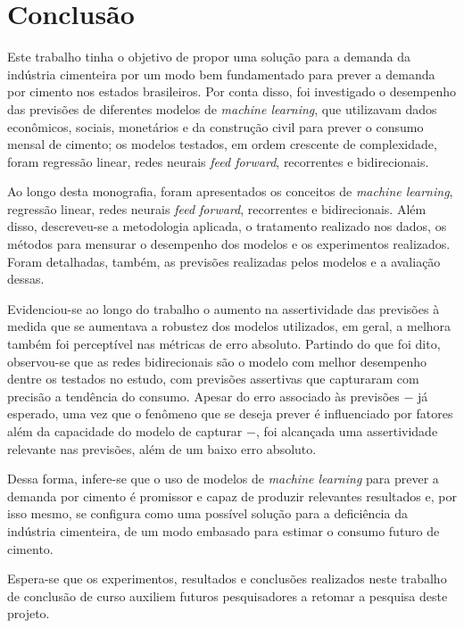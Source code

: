 
\chapter{Conclusão}
\label{chap:conclusao}

Este trabalho tinha o objetivo de propor uma solução para a demanda da indústria cimenteira 
por um modo bem fundamentado para prever a demanda por cimento nos estados brasileiros.
Por conta disso, foi investigado o desempenho das previsões de diferentes modelos de \textit{machine learning}, que utilizavam dados econômicos, sociais, monetários e da construção civil 
para prever o consumo mensal de cimento; os modelos testados, em ordem 
crescente de complexidade, foram regressão linear, redes neurais \textit{feed 
forward}, recorrentes e bidirecionais. 

Ao longo desta monografia, foram apresentados os conceitos de \textit{machine learning}, regressão linear, redes neurais \textit{feed forward}, 
recorrentes e bidirecionais. Além disso, descreveu-se a metodologia aplicada, 
o tratamento realizado nos dados, os métodos para mensurar o desempenho dos 
modelos e os experimentos realizados. Foram detalhadas, também, as previsões
realizadas pelos modelos e a avaliação dessas.

Evidenciou-se ao longo do trabalho o aumento na assertividade das previsões 
à medida que se aumentava a robustez dos modelos utilizados, em geral, a melhora
também foi perceptível nas métricas de erro absoluto. Partindo do que foi dito, observou-se que as redes bidirecionais
são o modelo com melhor desempenho dentre os testados no estudo, com previsões
assertivas que capturaram com precisão a tendência do consumo. Apesar do erro 
associado às previsões $-$ já esperado, uma vez que o fenômeno que se deseja prever 
é influenciado por fatores além da capacidade do modelo de capturar $-$, foi 
alcançada uma assertividade relevante nas previsões, além de um baixo erro 
absoluto.

Dessa forma, infere-se que o uso de modelos de \textit{machine learning} para prever a demanda por cimento é promissor e capaz de produzir relevantes
resultados e, por isso mesmo, se configura como uma possível solução para a deficiência da
indústria cimenteira, de um modo embasado para estimar o consumo futuro de cimento.


Espera-se que os experimentos, resultados e conclusões realizados 
neste trabalho de conclusão de curso auxiliem futuros pesquisadores a retomar a 
pesquisa deste projeto.
